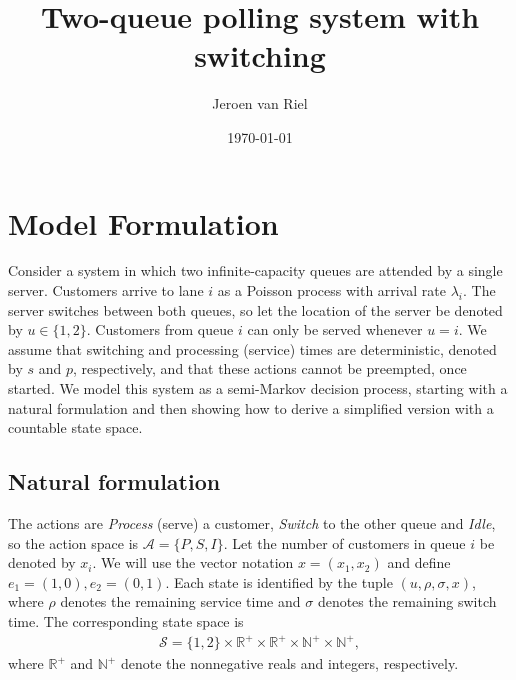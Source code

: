 \documentclass{article}
\author{Jeroen van Riel}
\date{\monthyeardate\today}
\title{Two-queue polling system with switching}
\theoremstyle{definition}
\theoremstyle{plain}
\begin{document}
\section{Model Formulation}
\label{sec:model}

Consider a system in which two infinite-capacity queues are attended by a single
server. Customers arrive to lane $i$ as a Poisson process with
arrival rate $\lambda_{i}$. The server switches between both queues, so let the
location of the server be denoted by $u \in \{1,2\}$. Customers from queue $i$ can
only be served whenever $u = i$. We assume that switching and processing
(service) times are deterministic, denoted by $s$ and $p$, respectively, and
that these actions cannot be preempted, once started. We model this system as a
semi-Markov decision process, starting with a natural formulation and then
showing how to derive a simplified version with a countable state space.

\subsection{Natural formulation}

The actions are \textit{Process} (serve) a customer, \textit{Switch} to the other queue and \textit{Idle},
so the action space is $\mathcal{A} = \{ P, S, I \}$. Let the number of customers
in queue $i$ be denoted by $x_{i}$. We will use the vector notation
$x = (x_{1}, x_{2})$ and define $e_{1} = (1, 0), e_{2} = (0, 1)$. Each state is
identified by the tuple $(u, \rho, \sigma, x)$, where $\rho$ denotes the remaining service
time and $\sigma$ denotes the remaining switch time. The corresponding state space is
\begin{align}
  \mathcal{S} = \{1, 2\} \times \mathbb{R}^{+} \times \mathbb{R}^{+} \times \mathbb{N}^{+} \times \mathbb{N}^{+} ,
\end{align}
where $\mathbb{R}^{+}$ and $\mathbb{N}^{+}$ denote the nonnegative reals and
integers, respectively.
\end{document}
